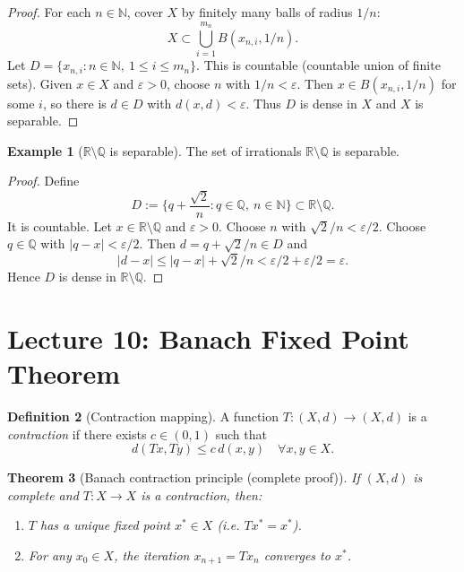 \documentclass[11pt]{article}
\newtheorem{theorem}{Theorem}[section]
\theoremstyle{definition}
\newtheorem{definition}[theorem]{Definition}
\newtheorem{example}[theorem]{Example}
\newcommand{\R}{\mathbb{R}}
\newcommand{\Q}{\mathbb{Q}}
\newcommand{\N}{\mathbb{N}}
\newcommand{\eps}{\varepsilon}
\begin{document}
\begin{proof}
For each $n\in\N$, cover $X$ by finitely many balls of radius $1/n$:
\[
X\subset \bigcup_{i=1}^{m_n} B(x_{n,i},1/n).
\]
Let $D=\{x_{n,i}:n\in\N,\ 1\le i\le m_n\}$. This is countable (countable union of finite sets).
Given $x\in X$ and $\eps>0$, choose $n$ with $1/n<\eps$.
Then $x\in B(x_{n,i},1/n)$ for some $i$, so there is $d\in D$ with $d(x,d)<\eps$.
Thus $D$ is dense in $X$ and $X$ is separable.
\end{proof}

\begin{example}[$\R\setminus\Q$ is separable]
The set of irrationals $\R\setminus\Q$ is separable.
\end{example}

\begin{proof}
Define
\[
D:=\Big\{q+\frac{\sqrt{2}}{n}: q\in\Q,\ n\in\N\Big\}\subset \R\setminus\Q.
\]
It is countable. Let $x\in\R\setminus\Q$ and $\eps>0$.
Choose $n$ with $\sqrt2/n<\eps/2$. Choose $q\in\Q$ with $|q-x|<\eps/2$.
Then $d=q+\sqrt2/n\in D$ and
\[
|d-x|\le |q-x|+\sqrt2/n<\eps/2+\eps/2=\eps.
\]
Hence $D$ is dense in $\R\setminus\Q$.
\end{proof}

\section{Lecture 10: Banach Fixed Point Theorem}

\begin{definition}[Contraction mapping]
A function $T:(X,d)\to (X,d)$ is a \emph{contraction} if there exists $c\in(0,1)$ such that
\[
d(Tx,Ty)\le c\,d(x,y)\quad\forall x,y\in X.
\]
\end{definition}

\begin{theorem}[Banach contraction principle (complete proof)]
If $(X,d)$ is complete and $T:X\to X$ is a contraction, then:
\begin{enumerate}[label=\textbf{(\alph*)}]
\item $T$ has a unique fixed point $x^*\in X$ (i.e. $Tx^*=x^*$).
\item For any $x_0\in X$, the iteration $x_{n+1}=T x_n$ converges to $x^*$.
\end{enumerate}
\end{theorem}
\end{document}

